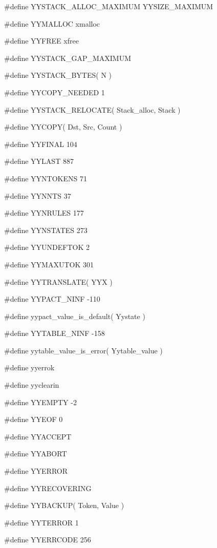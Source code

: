 \medskip
{\stt \#define YYSTACK\_ALLOC\_MAXIMUM YYSIZE\_MAXIMUM}

\medskip
{\stt \#define YYMALLOC xmalloc}

\medskip
{\stt \#define YYFREE xfree}

\medskip
{\stt \#define YYSTACK\_GAP\_MAXIMUM}

\medskip
{\stt \#define YYSTACK\_BYTES( N )}

\medskip
{\stt \#define YYCOPY\_NEEDED 1}

\medskip
{\stt \#define YYSTACK\_RELOCATE( Stack\_alloc, Stack )}

\medskip
{\stt \#define YYCOPY( Dst, Src, Count )}

\medskip
{\stt \#define YYFINAL 104}

\medskip
{\stt \#define YYLAST 887}

\medskip
{\stt \#define YYNTOKENS 71}

\medskip
{\stt \#define YYNNTS 37}

\medskip
{\stt \#define YYNRULES 177}

\medskip
{\stt \#define YYNSTATES 273}

\medskip
{\stt \#define YYUNDEFTOK 2}

\medskip
{\stt \#define YYMAXUTOK 301}

\medskip
{\stt \#define YYTRANSLATE( YYX )}

\medskip
{\stt \#define YYPACT\_NINF -110}

\medskip
{\stt \#define yypact\_value\_is\_default( Yystate )}

\medskip
{\stt \#define YYTABLE\_NINF -158}

\medskip
{\stt \#define yytable\_value\_is\_error( Yytable\_value )}

\medskip
{\stt \#define yyerrok}

\medskip
{\stt \#define yyclearin}

\medskip
{\stt \#define YYEMPTY -2}

\medskip
{\stt \#define YYEOF 0}

\medskip
{\stt \#define YYACCEPT}

\medskip
{\stt \#define YYABORT}

\medskip
{\stt \#define YYERROR}

\medskip
{\stt \#define YYRECOVERING}

\medskip
{\stt \#define YYBACKUP( Token, Value )}

\medskip
{\stt \#define YYTERROR 1}

\medskip
{\stt \#define YYERRCODE 256}

